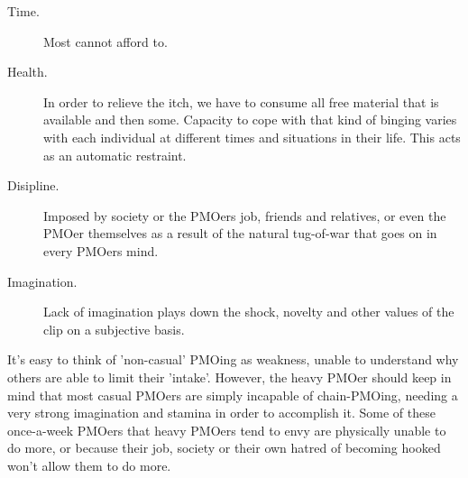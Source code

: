 \documentclass[easypeasy]{subfiles}
\begin{document}
  \begin{description}
  \item [Time.] Most cannot afford to.
  \item [Health.] In order to relieve the itch, we have to consume all free material that is available and then some. Capacity to cope with that kind of binging varies with each individual at different times and situations in their life. This acts as an automatic restraint.
  \item [Disipline.] Imposed by society or the PMOers job, friends and relatives, or even the PMOer themselves as a result of the natural tug-of-war that goes on in every PMOers mind.
  \item [Imagination.] Lack of imagination plays down the shock, novelty and other values of the clip on a subjective basis.
  \end{description}

It's easy to think of 'non-casual' PMOing as weakness, unable to understand why others are able to limit their 'intake'. However, the heavy PMOer should keep in mind that most casual PMOers are simply incapable of chain-PMOing, needing a very strong imagination and stamina in order to accomplish it. Some of these once-a-week PMOers that heavy PMOers tend to envy are physically unable to do more, or because their job, society or their own hatred of becoming hooked won't allow them to do more.
\end{document}
